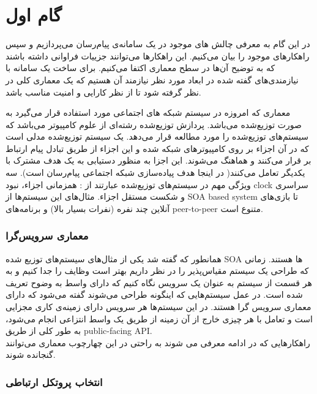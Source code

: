 \chapter{گام اول}\label{chap:1}

در این گام به معرفی چالش های موجود در یک سامانه‌ی پیام‌رسان می‌پردازیم و سپس راهکارهای موجود را بیان می‌کنیم. این راهکار‌ها می‌توانند جزییات فراوانی داشته باشند که به توضیح آن‌ها در سطح معماری اکتفا می‌کنیم.
برای ساخت یک سامانه با نیازمندی‌های گفته شده در ابعاد مورد نظر نیازمند آن هستیم که یک معماری کلی در نظر گرفته شود تا از نظر کارایی و امنیت مناسب باشد.

معماری‌ که امروزه در سیستم‌ شبکه های اجتماعی مورد استفاده قرار می‌گیرد به صورت توزیع‌شده  می‌باشد. پردازش توزیع‌شده رشته‌ای از علوم کامپیوتر می‌باشد که سیستم‌های توزیع‌شده را مورد مطالعه قرار می‌دهد. یک سیستم توزیع‌شده مدلی است که در آن اجزاء بر روی کامپیوتر‌های شبکه شده و این اجزاء از طریق تبادل پیام ارتباط بر قرار می‌کنند و هماهنگ می‌شوند. این اجزا به منظور دستیابی به یک هدف مشترک با یکدیگر تعامل می‌کنند( در اینجا هدف پیاده‌سازی شبکه اجتماعی پیام‌رسان است).  سه ویژگی مهم در سیستم‌های توزیع‌شده عبارتند از : همزمانی اجزاء، نبود clock سراسری و شکست مستقل اجزاء. مثال‌های این سیستم‌ها از SOA based system   تا بازی‌های آنلاین چند نفره (نفرات بسیار بالا) و برنامه‌های peer-to-peer متنوع است. 

\subsection{معماری سرویس‌گرا}
همانطور که گفته شد یکی از مثال‌های سیستم‌های توزیع شده SOA ‌ها هستند. زمانی که طراحی یک سیستم مقیاس‌پذیر را در نظر داریم بهتر است وظایف را جدا کنیم و به هر قسمت از سیستم به عنوان یک سرویس نگاه کنیم که دارای واسط به وضوح تعریف شده است. در عمل سیستم‌هایی که اینگونه طراحی می‌شوند گفته می‌شود که دارای معماری سرویس گرا  هستند. در این سیستم‌ها هر سرویس دارای زمینه‌ی کاری مجزایی است و تعامل با هر چیزی خارج از آن زمینه از طریق یک واسط انتزاعی انجام می‌شود، به طور کلی از طریق public-facing API.   \\
راهکارهایی که در ادامه معرفی می شوند به راحتی در این چهارچوب معماری می‌توانند گنجانده شوند.

\subsection{انتخاب پروتکل ارتباطی}

